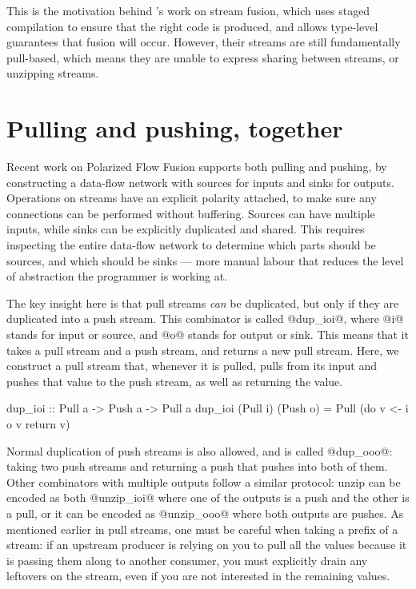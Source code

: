 This is the motivation behind \citet{kiselyov2016stream}'s work on stream fusion, which uses staged compilation to ensure that the right code is produced, and allows type-level guarantees that fusion will occur.
However, their streams are still fundamentally pull-based, which means they are unable to express sharing between streams, or unzipping streams.

\section{Pulling and pushing, together}

Recent work on Polarized Flow Fusion \citep{lippmeier2016polarized} supports both pulling and pushing, by constructing a data-flow network with sources for inputs and sinks for outputs.
Operations on streams have an explicit polarity attached, to make sure any connections can be performed without buffering.
Sources can have multiple inputs, while sinks can be explicitly duplicated and shared.
This requires inspecting the entire data-flow network to determine which parts should be sources, and which should be sinks --- more manual labour that reduces the level of abstraction the programmer is working at.

The key insight here is that pull streams \emph{can} be duplicated, but only if they are duplicated into a push stream.
This combinator is called @dup_ioi@, where @i@ stands for input or source, and @o@ stands for output or sink.
This means that it takes a pull stream and a push stream, and returns a new pull stream.
Here, we construct a pull stream that, whenever it is pulled, pulls from its input and pushes that value to the push stream, as well as returning the value.

\begin{code}
dup_ioi :: Pull a -> Push a -> Pull a
dup_ioi (Pull i) (Push o) = Pull (do
  v <- i
  o v
  return v)
\end{code}

Normal duplication of push streams is also allowed, and is called @dup_ooo@: taking two push streams and returning a push that pushes into both of them.
Other combinators with multiple outputs follow a similar protocol: unzip can be encoded as both @unzip_ioi@ where one of the outputs is a push and the other is a pull, or it can be encoded as @unzip_ooo@ where both outputs are pushes.
As mentioned earlier in pull streams, one must be careful when taking a prefix of a stream: if an upstream producer is relying on you to pull all the values because it is passing them along to another consumer, you must explicitly drain any leftovers on the stream, even if you are not interested in the remaining values.

